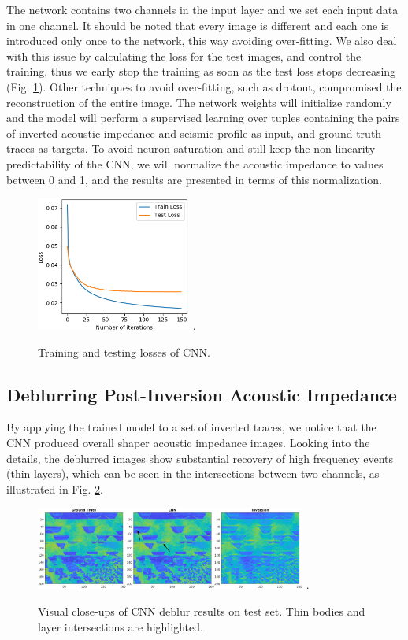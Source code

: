 \documentclass[journal]{IEEEtran}
\begin{document}
The network contains two channels in the input layer and we set
each input data in one channel.
It should be noted that every image is different and each
one is introduced only once to the network, this way avoiding
over-fitting. We also deal with this issue by calculating
the loss for the test images, and control the training,
thus we early stop the training as soon as the test loss
stops decreasing (Fig. \ref{ImLoss}).
Other techniques to avoid over-fitting, such as
drotout, compromised the reconstruction of the entire image.
The network weights
will initialize randomly and the model will perform a supervised
learning over tuples containing the pairs of inverted acoustic
impedance and seismic profile as input, and ground truth traces as targets.
To avoid neuron saturation and still keep the non-linearity predictability
of the CNN, we will normalize the acoustic impedance to values between 0 and 1,
and the results are presented in terms of this normalization.
\begin{figure}[!t]
\centering
\includegraphics[width=2.0in]{Figs/LossAcc}
\DeclareGraphicsExtensions.
\caption{Training and testing losses of CNN.}
\label{ImLoss}
\end{figure}

\subsection{Deblurring Post-Inversion Acoustic Impedance}
By applying the trained model to a set of inverted traces,
we notice that the CNN produced overall shaper acoustic
impedance images. Looking into the details,
the deblurred images show substantial recovery of high frequency events
(thin layers), which can be seen in the intersections between
two channels, as illustrated in Fig. \ref{ImSec26}.
\begin{figure}[!t]
\centering
\includegraphics[width=3.5in]{Figs/ImSec26}
\DeclareGraphicsExtensions.
\caption{Visual close-ups of CNN deblur results on test set. Thin bodies and
layer intersections are highlighted.}
\label{ImSec26}
\end{figure}
\end{document}
